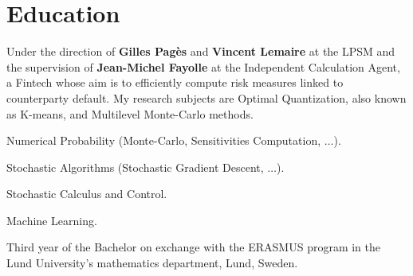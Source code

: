 \documentclass[]{deedy-resume-openfont}
\begin{document}
\begin{minipage}[t]{0.64\textwidth}



	\section{Education}

	Under the direction of \textbf{Gilles Pagès} and \textbf{Vincent Lemaire} at the LPSM and the supervision of \textbf{Jean-Michel Fayolle} at the Independent Calculation Agent, a Fintech whose aim is to efficiently compute risk measures linked to counterparty default. My research subjects are Optimal Quantization, also known as K-means, and Multilevel Monte-Carlo methods.
	\sectionsep


	\vspace{\topsep}
	\begin{tightemize}
		\item Numerical Probability (Monte-Carlo, Sensitivities Computation, $\dots$).
		\item Stochastic Algorithms (Stochastic Gradient Descent, $\dots$).
		\item Stochastic Calculus and Control.
		\item Machine Learning.
	\end{tightemize}
	\sectionsep


	Third year of the Bachelor on exchange with the ERASMUS program in the Lund University's mathematics department, Lund, Sweden.



	\vspace{\topsep}
	\vspace{\topsep}

\end{minipage}
\end{document}
